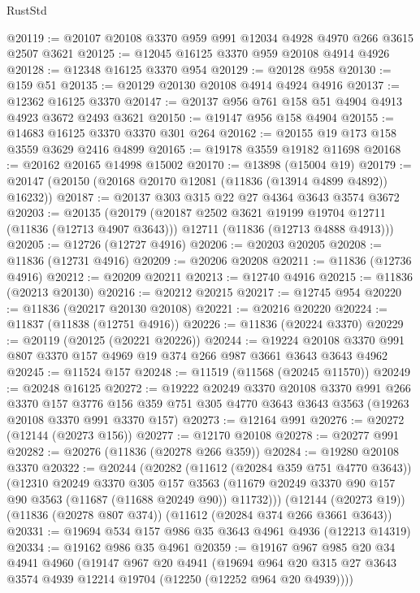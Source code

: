 \begin{lexlean}{RustStd}
\begin{coremodule}
@20119 := @20107 @20108 @3370 @959 @991 @12034 @4928 @4970 @266 @3615 @2507 @3621
@20125 := @12045 @16125 @3370 @959 @20108 @4914 @4926
@20128 := @12348 @16125 @3370 @954
@20129 := @20128 @958
@20130 := @159 @51
@20135 := @20129 @20130 @20108 @4914 @4924 @4916
@20137 := @12362 @16125 @3370
@20147 := @20137 @956 @761 @158 @51 @4904 @4913 @4923 @3672 @2493 @3621
@20150 := @19147 @956 @158 @4904
@20155 := @14683 @16125 @3370 @3370 @301 @264
@20162 := @20155 @19 @173 @158 @3559 @3629 @2416 @4899
@20165 := @19178 @3559 @19182 @11698
@20168 := @20162 @20165 @14998 @15002
@20170 := @13898 (@15004 @19)
@20179 := @20147 (@20150 (@20168 @20170 @12081 (@11836 (@13914 @4899 @4892)) @16232))
@20187 := @20137 @303 @315 @22 @27 @4364 @3643 @3574 @3672
@20203 := @20135
    (@20179
      (@20187 @2502 @3621 @19199 @19704 @12711 (@11836 (@12713 @4907 @3643)))
      @12711
      (@11836 (@12713 @4888 @4913)))
@20205 := @12726 (@12727 @4916)
@20206 := @20203 @20205
@20208 := @11836 (@12731 @4916)
@20209 := @20206 @20208
@20211 := @11836 (@12736 @4916)
@20212 := @20209 @20211
@20213 := @12740 @4916
@20215 := @11836 (@20213 @20130)
@20216 := @20212 @20215
@20217 := @12745 @954
@20220 := @11836 (@20217 @20130 @20108)
@20221 := @20216 @20220
@20224 := @11837 (@11838 (@12751 @4916))
@20226 := @11836 (@20224 @3370)
@20229 := @20119 (@20125 (@20221 @20226))
@20244 := @19224 @20108 @3370 @991 @807 @3370 @157 @4969 @19 @374 @266 @987 @3661 @3643 @3643 @4962
@20245 := @11524 @157
@20248 := @11519 (@11568 (@20245 @11570))
@20249 := @20248 @16125
@20272 := @19222
    @20249
    @3370
    @20108
    @3370
    @991
    @266
    @3370
    @157
    @3776
    @156
    @359
    @751
    @305
    @4770
    @3643
    @3643
    @3563
    (@19263 @20108 @3370 @991 @3370 @157)
@20273 := @12164 @991
@20276 := @20272 (@12144 (@20273 @156))
@20277 := @12170 @20108
@20278 := @20277 @991
@20282 := @20276 (@11836 (@20278 @266 @359))
@20284 := @19280 @20108 @3370
@20322 := @20244
    (@20282
      (@11612 (@20284 @359 @751 @4770 @3643))
      (@12310
        @20249
        @3370
        @305
        @157
        @3563
        (@11679 @20249 @3370 @90 @157 @90 @3563 (@11687 (@11688 @20249 @90)) @11732)))
    (@12144 (@20273 @19))
    (@11836 (@20278 @807 @374))
    (@11612 (@20284 @374 @266 @3661 @3643))
@20331 := @19694 @534 @157 @986 @35 @3643 @4961 @4936 (@12213 @14319)
@20334 := @19162 @986 @35 @4961
@20359 := @19167
    @967
    @985
    @20
    @34
    @4941
    @4960
    (@19147
      @967
      @20
      @4941
      (@19694 @964 @20 @315 @27 @3643 @3574 @4939 @12214 @19704 (@12250 (@12252 @964 @20 @4939))))

\end{coremodule}
\end{lexlean}
